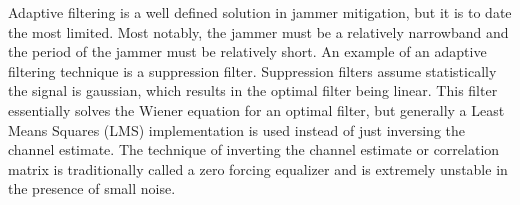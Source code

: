 \begin{table}[!ht]\label{antitable}
\centering
{}
\caption{Comparision of Anti-Jamming Techniques}
\end{table}

Adaptive filtering is a well defined solution in jammer mitigation, but it is to date the most limited.  Most notably, the jammer must be a relatively narrowband and the period of the jammer must be relatively short.  An example of an adaptive filtering technique is a suppression filter.  Suppression filters assume statistically the signal is gaussian, which results in the optimal filter being linear.  This filter essentially solves the Wiener equation for an optimal filter, but generally a Least Means Squares (LMS) implementation is used instead of just inversing the channel estimate\cite{11}. The technique of inverting the channel estimate or correlation matrix is traditionally called a zero forcing equalizer and is extremely unstable in the presence of small noise.\\

